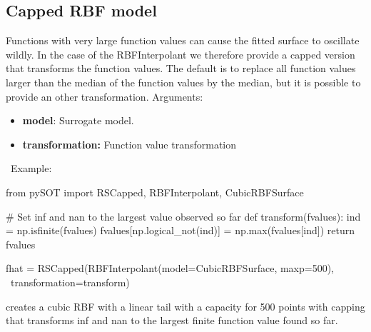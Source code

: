 \documentclass[]{article}
\begin{document}
\subsection{Capped RBF model} Functions with very large function values can cause the fitted surface to oscillate wildly. In the case of the RBFInterpolant we therefore provide a capped version that transforms the function values. The default is to replace all function values larger than the median of the function values by the median, but it is possible to provide an other transformation. Arguments: \\
\begin{itemize}
\item \textbf{model}: Surrogate model.
\item \textbf{transformation:} Function value transformation
\end{itemize}
\ \newline Example: 
\begin{python}
from pySOT import RSCapped, RBFInterpolant, CubicRBFSurface

# Set inf and nan to the largest value observed so far	          
def transform(fvalues):
	ind = np.isfinite(fvalues)
	fvalues[np.logical_not(ind)] = np.max(fvalues[ind])
	return fvalues
	
fhat = RSCapped(RBFInterpolant(model=CubicRBFSurface, maxp=500), \ 
		transformation=transform)
\end{python}
creates a cubic RBF with a linear tail with a capacity for 500 points with capping that transforms inf and nan to the largest finite function value found so far.
\end{document}
